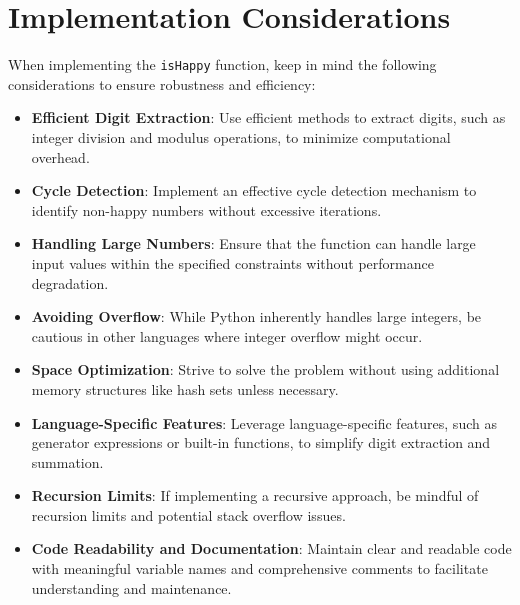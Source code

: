 \section*{Implementation Considerations}

When implementing the \texttt{isHappy} function, keep in mind the following considerations to ensure robustness and efficiency:

\begin{itemize}
    \item \textbf{Efficient Digit Extraction}: Use efficient methods to extract digits, such as integer division and modulus operations, to minimize computational overhead.
    
    \item \textbf{Cycle Detection}: Implement an effective cycle detection mechanism to identify non-happy numbers without excessive iterations.
    
    \item \textbf{Handling Large Numbers}: Ensure that the function can handle large input values within the specified constraints without performance degradation.
    
    \item \textbf{Avoiding Overflow}: While Python inherently handles large integers, be cautious in other languages where integer overflow might occur.
    
    \item \textbf{Space Optimization}: Strive to solve the problem without using additional memory structures like hash sets unless necessary.
    
    \item \textbf{Language-Specific Features}: Leverage language-specific features, such as generator expressions or built-in functions, to simplify digit extraction and summation.
    
    \item \textbf{Recursion Limits}: If implementing a recursive approach, be mindful of recursion limits and potential stack overflow issues.
    
    \item \textbf{Code Readability and Documentation}: Maintain clear and readable code with meaningful variable names and comprehensive comments to facilitate understanding and maintenance.
    

\end{itemize}
